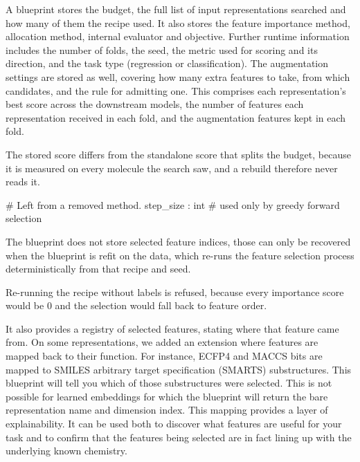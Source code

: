 A blueprint stores the budget, the full list of input representations searched and how many of them the recipe used. It also stores the feature importance method, allocation method, internal evaluator and objective. Further runtime information includes the number of folds, the seed, the metric used for scoring and its direction, and the task type (regression or classification). The augmentation settings are stored as well, covering how many extra features to take, from which candidates, and the rule for admitting one.
This comprises each representation's best score across the downstream models, the number of features each representation received in each fold, and the augmentation features kept in each fold.

The stored score differs from the standalone score that splits the budget, because it is measured on every molecule the search saw, and a rebuild therefore never reads it.


  # Left from a removed method.
  step_size             : int                 # used only by greedy forward selection

The blueprint does not store selected feature indices, those can only be recovered when the blueprint is refit on the data, which re-runs the feature selection process deterministically from that recipe and seed.

Re-running the recipe without labels is refused, because every importance score would be 0 and the selection would fall back to feature order.

It also provides a registry of selected features, stating where that feature came from. On some representations, we added an extension where features are mapped back to their function. For instance, ECFP4 and MACCS bits are mapped to SMILES arbitrary target specification (SMARTS) substructures. This blueprint will tell you which of those substructures were selected. This is not possible for learned embeddings for which the blueprint will return the bare representation name and dimension index. This mapping provides a layer of explainability. It can be used both to discover what features are useful for your task and to confirm that the features being selected are in fact lining up with the underlying known chemistry.

